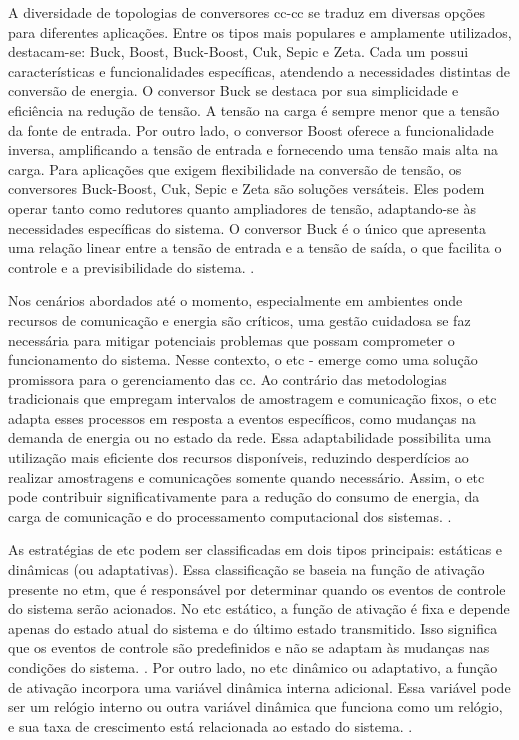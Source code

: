 A diversidade de topologias de conversores \acrshort{cc}-\acrshort{cc} se traduz em diversas opções para diferentes aplicações. Entre os tipos mais populares e amplamente utilizados, destacam-se: Buck, Boost, Buck-Boost, Cuk, Sepic e Zeta. Cada um possui características e funcionalidades específicas, atendendo a necessidades distintas de conversão de energia. O conversor Buck se destaca por sua simplicidade e eficiência na redução de tensão. A tensão na carga é sempre menor que a tensão da fonte de entrada. Por outro lado, o conversor Boost oferece a funcionalidade inversa, amplificando a tensão de entrada e fornecendo uma tensão mais alta na carga. Para aplicações que exigem flexibilidade na conversão de tensão, os conversores Buck-Boost, Cuk, Sepic e Zeta são soluções versáteis. Eles podem operar tanto como redutores quanto ampliadores de tensão, adaptando-se às necessidades específicas do sistema. O conversor Buck é o único que apresenta uma relação linear entre a tensão de entrada e a tensão de saída, o que facilita o controle e a previsibilidade do sistema. \cite{martins2008}.

Nos cenários abordados até o momento, especialmente em ambientes onde recursos de comunicação e energia são críticos, uma gestão cuidadosa se faz necessária para mitigar potenciais problemas que possam comprometer o funcionamento do sistema. Nesse contexto, o \acrfull{etc} - emerge como uma solução promissora para o gerenciamento das  \acrshort{cc}. Ao contrário das metodologias tradicionais que empregam intervalos de amostragem e comunicação fixos, o \acrshort{etc} adapta esses processos em resposta a eventos específicos, como mudanças na demanda de energia ou no estado da rede. Essa adaptabilidade possibilita uma utilização mais eficiente dos recursos disponíveis, reduzindo desperdícios ao realizar amostragens e comunicações somente quando necessário. Assim, o \acrshort{etc} pode contribuir significativamente para a redução do consumo de energia, da carga de comunicação e do processamento computacional dos sistemas. \cite{coutinho2021}.

As estratégias de \acrshort{etc} podem ser classificadas em dois tipos principais: estáticas e dinâmicas (ou adaptativas). Essa classificação se baseia na função de ativação presente no \acrshort{etm}, que é responsável por determinar quando os eventos de controle do sistema serão acionados. No \acrshort{etc} estático, a função de ativação é fixa e depende apenas do estado atual do sistema e do último estado transmitido. Isso significa que os eventos de controle são predefinidos e não se adaptam às mudanças nas condições do sistema. \cite{coutinho2021}. Por outro lado, no \acrshort{etc} dinâmico ou adaptativo, a função de ativação incorpora uma variável dinâmica interna adicional. Essa variável pode ser um relógio interno ou outra variável dinâmica que funciona como um relógio, e sua taxa de crescimento está relacionada ao estado do sistema. \cite{Girard2015}.

